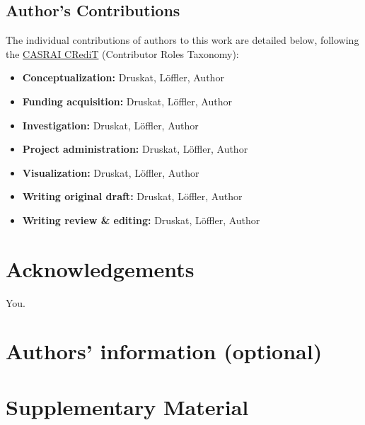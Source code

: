 \documentclass[a4paper,num-refs,numbers,sort&compress]{de-rse}
\begin{document}
\subsection{Author's Contributions}
The individual contributions of authors to this work are detailed below, following the \href{https://casrai.org/credit/}{CASRAI CRediT} (Contributor Roles Taxonomy):
\begin{itemize}
    \item \textbf{Conceptualization:}  Druskat, Löffler, Author
    \item \textbf{Funding acquisition:} Druskat, Löffler, Author
    \item \textbf{Investigation:} Druskat, Löffler, Author
    \item \textbf{Project administration:} Druskat, Löffler, Author
    \item \textbf{Visualization:} Druskat, Löffler, Author
    \item \textbf{Writing original draft:} Druskat, Löffler, Author
    \item \textbf{Writing review \& editing:} Druskat, Löffler, Author
\end{itemize}

\section{Acknowledgements}

You.

\section{Authors' information (optional)}




%


\renewcommand{\thefigure}{S\arabic{figure}}
\setcounter{figure}{0}  

\section{Supplementary Material}
\end{document}
